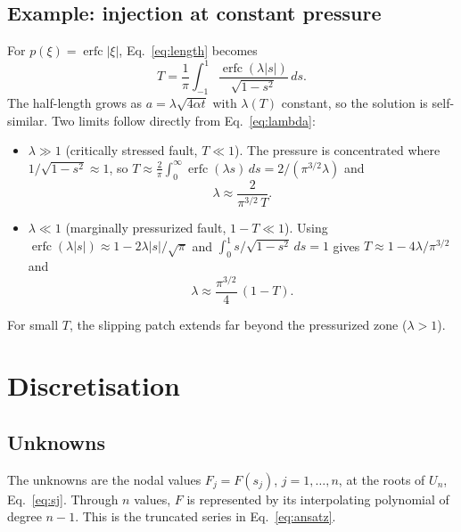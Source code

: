 \documentclass[12pt]{article}
\newcommand{\erfc}{\operatorname{erfc}}
\begin{document}
\subsection{Example: injection at constant pressure}\label{sec:erfc}
For $p(\xi)=\erfc|\xi|$, Eq.~\eqref{eq:length} becomes
\begin{equation}\label{eq:lambda}
	T = \frac1\pi\int_{-1}^{1}\frac{\erfc(\lambda|s|)}{\sqrt{1-s^2}}\,ds .
\end{equation}
The half-length grows as $a = \lambda\sqrt{4\alpha t}$ with $\lambda(T)$
constant, so the solution is self-similar. Two limits follow directly from
Eq.~\eqref{eq:lambda}:
\begin{itemize}
	\item $\lambda\gg1$ (critically stressed fault, $T\ll1$). The pressure is
	      concentrated where $1/\sqrt{1-s^2}\approx1$, so
	      $T\approx\frac2\pi\int_0^\infty\erfc(\lambda s)\,ds
		      = 2/(\pi^{3/2}\lambda)$ and
	      \begin{equation*}
		      \lambda \approx \frac{2}{\pi^{3/2}\,T}.
	      \end{equation*}
	\item $\lambda\ll1$ (marginally pressurized fault, $1-T\ll1$). Using
	      $\erfc(\lambda|s|)\approx1-2\lambda|s|/\sqrt\pi$ and
	      $\int_0^1 s/\sqrt{1-s^2}\,ds=1$ gives $T\approx1-4\lambda/\pi^{3/2}$ and
	      \begin{equation*}
		      \lambda \approx \frac{\pi^{3/2}}{4}\,(1-T).
	      \end{equation*}
\end{itemize}
For small $T$, the slipping patch extends far beyond the pressurized zone
($\lambda>1$).

\section{Discretisation}\label{sec:discrete}

\subsection{Unknowns}
The unknowns are the nodal values $F_j = F(s_j)$, $j=1,\dots,n$, at the roots of
$U_n$, Eq.~\eqref{eq:sj}. Through $n$ values, $F$ is represented by its
interpolating polynomial of degree $n-1$. This is the truncated series in
Eq.~\eqref{eq:ansatz}.
\end{document}

